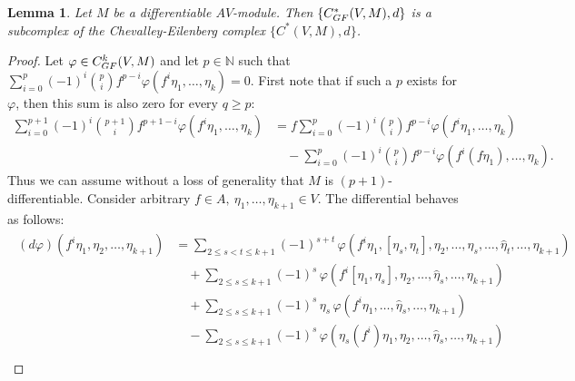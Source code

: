 \documentclass[12pt]{amsart}
\newcommand{\N}{{\mathbb{N}}}
\newcommand{\GF}{{\textup{GF}}}
\newcommand{\vphi}{{\varphi}}
\newtheorem{lemma}[theorem]{Lemma}
\theoremstyle{definition}
\begin{document}
\begin{lemma}
Let $M$ be a differentiable $AV$-module. Then
$\{C^*_{\GF}(V, M), d\}$ is a subcomplex of the Chevalley-Eilenberg complex
$\{ C^*(V, M), d\}$.
\end{lemma}

\begin{proof}
Let $\vphi \in C_{\GF}^k(V, M)$ and let $p\in \N$ such that $\sum_{i=0}^p (-1)^i \binom{p}{i} f^{p-i} \vphi(f^i \eta_1, \dots, \eta_k)=0$. First note that if such a $p$ exists for $\vphi$, then this sum is also zero for every $q \geq p$:
\begin{align*}
\sum_{i=0}^{p+1}(-1)^{i} \binom{p+1}{i} f^{p+1-i} \vphi(f^i \eta_1, \dots, \eta_k) & = f \sum_{i=0}^{p}(-1)^{i} \binom{p}{i} f^{p-i} \vphi(f^i \eta_1, \dots, \eta_k) \\ & \quad - \sum_{i=0}^{p}(-1)^{i} \binom{p}{i} f^{p-i} \vphi(f^i (f\eta_1), \dots, \eta_k).
\end{align*}
Thus we can assume without a loss of generality that $M$ is $(p+1)$-differentiable.
Consider arbitrary $f \in A, \ \eta_1, \dots, \eta_{k+1} \in V$. The differential behaves as follows:
\begin{align}\label{equation:equation1}
\begin{split}
(d\vphi)(f^i \eta_1, \eta_2, \dots, \eta_{k+1}) 
&= \sum_{2 \leq s < t \leq k+1 }(-1)^{s+t} \,\vphi (f^i \eta_1,[\eta_s, \eta_t], \eta_2, \dots,\hat{\eta}_s, \dots, \hat{\eta}_t, \dots, \eta_{k+1}) \\
& \quad + \sum_{2 \leq s \leq k+1} (-1)^s \,\vphi (f^i [\eta_1,\eta_s], \eta_2, \dots, \hat{\eta}_s, \dots, \eta_{k+1}) \\
& \quad + \sum_{2 \leq s \leq k+1 }(-1)^{s} \,\eta_s \,\vphi(f^i\eta_1, \dots, \hat{\eta}_s, \dots, \eta_{k+1}) \\
& \quad - \sum_{2 \leq s \leq k+1 }(-1)^{s}  \,\vphi(\eta_s(f^i) \eta_1, \eta_2, \dots, \hat{\eta}_s, \dots, \eta_{k+1}) \\

\end{split}
\end{align}
\end{proof}
\end{document}
